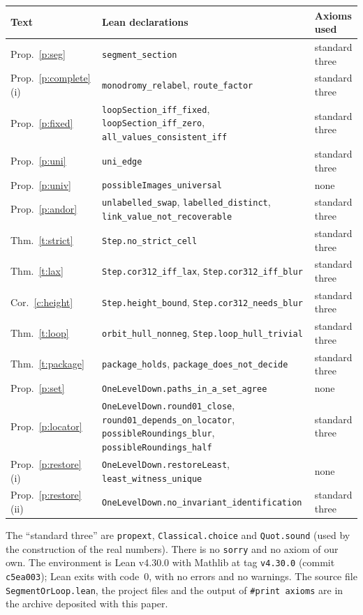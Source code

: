 \documentclass[11pt,a4paper]{article}
\newcommand{\lean}[1]{\texttt{#1}}
\theoremstyle{plain}
\theoremstyle{definition}
\theoremstyle{remark}
\begin{document}
\begin{center}\small
\begin{tabularx}{\linewidth}{@{}l>{\raggedright\arraybackslash}X l@{}}
\toprule
Text & Lean declarations & Axioms used\\
\midrule
Prop.~\ref{p:seg} & \lean{segment\_section} & standard three\\
Prop.~\ref{p:complete}\,(i) & \lean{monodromy\_relabel}, \lean{route\_factor} & standard three\\
Prop.~\ref{p:fixed} & \lean{loopSection\_iff\_fixed}, \lean{loopSection\_iff\_zero}, \lean{all\_values\_consistent\_iff} &
standard three\\
Prop.~\ref{p:uni} & \lean{uni\_edge} & standard three\\
Prop.~\ref{p:univ} & \lean{possibleImages\_universal} & none\\
Prop.~\ref{p:andor} & \lean{unlabelled\_swap}, \lean{labelled\_distinct}, \lean{link\_value\_not\_recoverable} & standard
three\\
Thm.~\ref{t:strict} & \lean{Step.no\_strict\_cell} & standard three\\
Thm.~\ref{t:lax} & \lean{Step.cor312\_iff\_lax}, \lean{Step.cor312\_iff\_blur} & standard three\\
Cor.~\ref{c:height} & \lean{Step.height\_bound}, \lean{Step.cor312\_needs\_blur} & standard three\\
Thm.~\ref{t:loop} & \lean{orbit\_hull\_nonneg}, \lean{Step.loop\_hull\_trivial} & standard three\\
Thm.~\ref{t:package} & \lean{package\_holds}, \lean{package\_does\_not\_decide} & standard three\\
Prop.~\ref{p:set} & \lean{OneLevelDown.paths\_in\_a\_set\_agree} & none\\
Prop.~\ref{p:locator} & \lean{OneLevelDown.round01\_close}, \lean{round01\_depends\_on\_locator},
\lean{possibleRoundings\_blur}, \lean{possibleRoundings\_half} & standard three\\
Prop.~\ref{p:restore}\,(i) & \lean{OneLevelDown.restoreLeast}, \lean{least\_witness\_unique} & none\\
Prop.~\ref{p:restore}\,(ii) & \lean{OneLevelDown.no\_invariant\_identification} & standard three\\
\bottomrule
\end{tabularx}
\end{center}
The ``standard three'' are \lean{propext}, \lean{Classical.choice} and \lean{Quot.sound} (used by the construction of the
real numbers). There is no \lean{sorry} and no axiom of our own. The environment is Lean v4.30.0 with Mathlib at tag \lean{v4.30.0} (commit \lean{c5ea003}); Lean exits with
code~$0$, with no errors and no warnings. The source file \lean{SegmentOrLoop.lean}, the
project files and the output of \lean{\#print axioms} are in the archive deposited with this paper.
\end{document}
